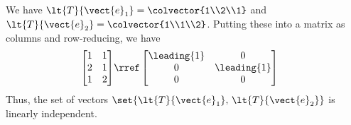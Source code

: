 We have $\lt{T}{\vect{e}_1} = \colvector{1\\2\\1}$ and $\lt{T}{\vect{e}_2} = \colvector{1\\1\\2}$.  Putting these into a matrix as columns and row-reducing, we have
%
\begin{align*}
\begin{bmatrix} 
1 & 1\\
2 & 1\\
1 & 2 
\end{bmatrix}
&\rref
\begin{bmatrix} 
\leading{1} & 0 \\ 
0 & \leading{1}\\ 
0 & 0 
\end{bmatrix}
\end{align*}
%
Thus, the set of vectors $\set{\lt{T}{\vect{e}_1},\,\lt{T}{\vect{e}_2}}$ is linearly independent.